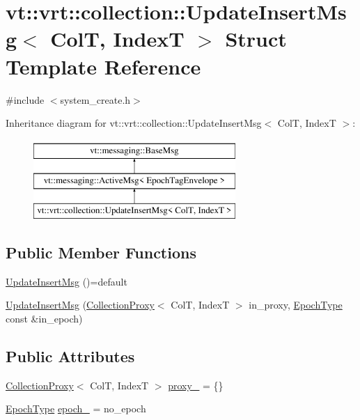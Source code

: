 \hypertarget{structvt_1_1vrt_1_1collection_1_1_update_insert_msg}{}\section{vt\+:\+:vrt\+:\+:collection\+:\+:Update\+Insert\+Msg$<$ ColT, IndexT $>$ Struct Template Reference}
\label{structvt_1_1vrt_1_1collection_1_1_update_insert_msg}


{\ttfamily \#include $<$system\+\_\+create.\+h$>$}

Inheritance diagram for vt\+:\+:vrt\+:\+:collection\+:\+:Update\+Insert\+Msg$<$ ColT, IndexT $>$\+:\begin{figure}[H]
\begin{center}
\leavevmode
\includegraphics[height=3.000000cm]{structvt_1_1vrt_1_1collection_1_1_update_insert_msg}
\end{center}
\end{figure}
\subsection*{Public Member Functions}
\begin{DoxyCompactItemize}
\item 
\hyperlink{structvt_1_1vrt_1_1collection_1_1_update_insert_msg_aae10dc2f0e158e40397336160f5dad64}{Update\+Insert\+Msg} ()=default
\item 
\hyperlink{structvt_1_1vrt_1_1collection_1_1_update_insert_msg_a379f7f91b839a1e691de20ac789f010e}{Update\+Insert\+Msg} (\hyperlink{structvt_1_1vrt_1_1collection_1_1_collection_proxy}{Collection\+Proxy}$<$ ColT, IndexT $>$ in\+\_\+proxy, \hyperlink{namespacevt_a985a5adf291c34a3ca263b3378388236}{Epoch\+Type} const \&in\+\_\+epoch)
\end{DoxyCompactItemize}
\subsection*{Public Attributes}
\begin{DoxyCompactItemize}
\item 
\hyperlink{structvt_1_1vrt_1_1collection_1_1_collection_proxy}{Collection\+Proxy}$<$ ColT, IndexT $>$ \hyperlink{structvt_1_1vrt_1_1collection_1_1_update_insert_msg_ae24b0b8a8147f78cb6275b97ddb3d6a0}{proxy\+\_\+} = \{\}
\item 
\hyperlink{namespacevt_a985a5adf291c34a3ca263b3378388236}{Epoch\+Type} \hyperlink{structvt_1_1vrt_1_1collection_1_1_update_insert_msg_a6639021b34fd80c4c17a65b7fe9034f6}{epoch\+\_\+} = no\+\_\+epoch
\end{DoxyCompactItemize}
